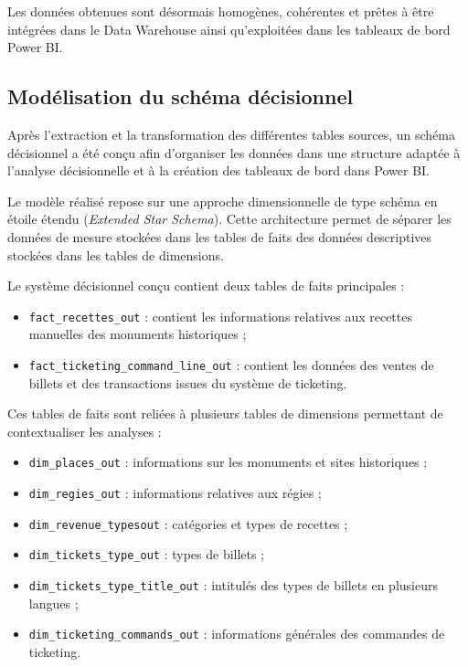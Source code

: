 \documentclass[12pt,a4paper]{report}
\begin{document}
		Les données obtenues sont désormais homogènes, cohérentes et prêtes à être intégrées dans le Data Warehouse ainsi qu’exploitées dans les tableaux de bord Power BI.
		\subsection{Modélisation du schéma décisionnel}
		
		Après l’extraction et la transformation des différentes tables sources, un schéma décisionnel a été conçu afin d’organiser les données dans une structure adaptée à l’analyse décisionnelle et à la création des tableaux de bord dans Power BI.
		
		Le modèle réalisé repose sur une approche dimensionnelle de type schéma en étoile étendu (\textit{Extended Star Schema}). Cette architecture permet de séparer les données de mesure stockées dans les tables de faits des données descriptives stockées dans les tables de dimensions.
		
		Le système décisionnel conçu contient deux tables de faits principales :
		
		\begin{itemize}
			\item \texttt{fact\_recettes\_out} : contient les informations relatives aux recettes manuelles des monuments historiques ;
			
			\item \texttt{fact\_ticketing\_command\_line\_out} : contient les données des ventes de billets et des transactions issues du système de ticketing.
		\end{itemize}
		
		Ces tables de faits sont reliées à plusieurs tables de dimensions permettant de contextualiser les analyses :
		
		\begin{itemize}
			\item \texttt{dim\_places\_out} : informations sur les monuments et sites historiques ;
			
			\item \texttt{dim\_regies\_out} : informations relatives aux régies ;
			
			\item \texttt{dim\_revenue\_typesout} : catégories et types de recettes ;
			
			\item \texttt{dim\_tickets\_type\_out} : types de billets ;
			
			\item \texttt{dim\_tickets\_type\_title\_out} : intitulés des types de billets en plusieurs langues ;
			
			\item \texttt{dim\_ticketing\_commands\_out} : informations générales des commandes de ticketing.
		\end{itemize}
		
\end{document}
